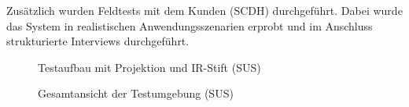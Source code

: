 Zusätzlich wurden Feldtests mit dem Kunden (SCDH) durchgeführt. Dabei wurde das System in realistischen Anwendungsszenarien erprobt und im Anschluss strukturierte Interviews durchgeführt.

\begin{figure}[H]
    \begin{minipage}{0.48\textwidth}
    \centering
    \caption{Testaufbau mit Projektion und IR-Stift (SUS)}
    \label{Fig:Data1}
  \end{minipage}
  \hfill
  \begin{minipage}{0.48\textwidth}
    \centering
    \caption{Gesamtansicht der Testumgebung (SUS)}
    \label{Fig:Data2}
  \end{minipage}
\end{figure}


